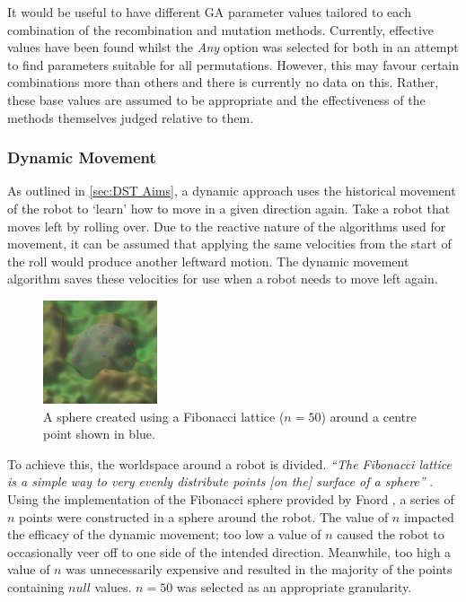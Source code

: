 \documentclass{article}
\begin{document}
\noindent It would be useful to have different GA parameter values tailored to each combination of the recombination and mutation methods. Currently, effective values have been found whilst the \textit{Any} option was selected for both in an attempt to find parameters suitable for all permutations. However, this may favour certain combinations more than others and there is currently no data on this. Rather, these base values are assumed to be appropriate and the effectiveness of the methods themselves judged relative to them. \\

\subsubsection{Dynamic Movement}
\label{sec:DST Imp}
As outlined in \ref{sec:DST Aims}, a dynamic approach uses the historical movement of the robot to ‘learn’ how to move in a given direction again. 
Take a robot that moves left by rolling over. Due to the reactive nature of the algorithms used for movement, it can be assumed that applying the same velocities from the start of the roll would produce another leftward motion. The dynamic movement algorithm saves these velocities for use when a robot needs to move left again. \\
\begin{figure}
    \centering
    \vspace*{-7mm}
    \includegraphics[width=0.3\textwidth]{spherePoints}
    \vspace*{-5mm}
    \caption{A sphere created using a Fibonacci lattice ($n=50$) around a centre point shown in blue.}
\end{figure}
To achieve this, the worldspace around a robot is divided. \textit{“The Fibonacci lattice is a simple way to very evenly distribute points [on the] surface of a sphere”} . Using the implementation of the Fibonacci sphere provided by Fnord , a series of $n$ points were constructed in a sphere around the robot. The value of $n$ impacted the efficacy of the dynamic movement; too low a value of $n$ caused the robot to occasionally veer off to one side of the intended direction. Meanwhile, too high a value of $n$ was unnecessarily expensive and resulted in the majority of the points containing $null$ values. $n=50$ was selected as an appropriate granularity.\\
\end{document}
